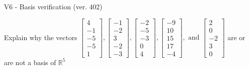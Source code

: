 \begin{exercise}
  \begin{exerciseTitle}V6 - Basis verification (ver. 402)\end{exerciseTitle}
  \begin{exerciseStatement}
    Explain why the vectors \(\left[\begin{array}{r}
4 \\
-1 \\
-5 \\
-5 \\
1
\end{array}\right] , \left[\begin{array}{r}
-1 \\
-2 \\
3 \\
-2 \\
-3
\end{array}\right] , \left[\begin{array}{r}
-2 \\
-5 \\
-3 \\
0 \\
4
\end{array}\right] , \left[\begin{array}{r}
-9 \\
10 \\
15 \\
17 \\
-4
\end{array}\right] , \text{ and } \left[\begin{array}{r}
2 \\
0 \\
-2 \\
3 \\
0
\end{array}\right]\) are or are not a basis of \(\mathbb{R}^5\)	



\end{exerciseStatement}
\end{exercise}

